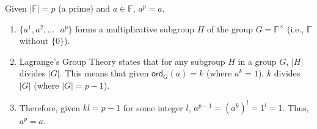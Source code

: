 \begin{tcolorbox}[title={\textbf{\tboxtheorem{\ref*{subsec:order-theorem}.4} Fermat's Little Theorem}}]
Given $|\mathbb{F}| = p$ (a prime) and $a \in \mathbb{F}$, $a^p = a$.
\end{tcolorbox}
\begin{myproof}
    \begin{enumerate}
    \item $\{a^1, a^2, ... \text{ } a^p\}$ forms a multiplicative subgroup $H$ of the group $G = \mathbb{F^{\times}}$ (i.e., $\mathbb{F}$ without $\{0\}$). 
    \item Lagrange's Group Theory states that for any subgroup $H$ in a group $G$, $|H|$ divides $|G|$. This means that given $\textsf{ord}_G(a) = k$ (where $a^k = 1$), $k$ divides $|G|$ (where $|G| = p - 1$). 
    \item Therefore, given $kl = p - 1$ for some integer $l$, $a^{p-1} = (a^k)^l = 1^l = 1$. Thus, $a^p = a$.
    \end{enumerate}
\end{myproof}
